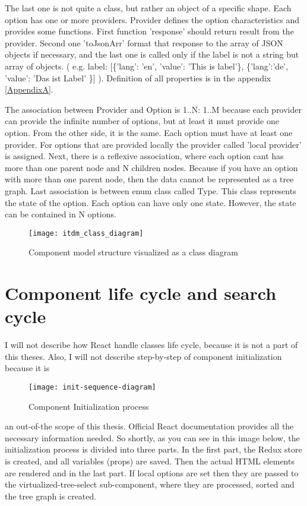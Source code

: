 The last one is not quite a class, but rather an object of a specific shape. Each option has one or more providers. Provider defines the option characteristics and provides some functions. First function 'response' should return result from the provider. Second one 'toJsonArr' format that response to the array of JSON objects if necessary, and the last one is called only if the label is not a string but array of objects. ( e.g. label: [\{'lang': 'en', 'value': 'This is label'\}, \{'lang':'de', 'value': 'Das ist Label' \}] ). Definition of all properties is in the appendix \ref{AppendixA}.

The association between Provider and Option is 1..N: 1..M because each provider can provide the infinite number of options, but at least it must provide one option. From the other side, it is the same. Each option must have at least one provider. For options that are provided locally the provider called 'local provider' is assigned. 
Next, there is a reflexive association, where each option cant has more than one parent node and N children nodes. Because if you have an option with more than one parent node, then the data cannot be represented as a tree graph.
Last association is between enum class called Type. This class represents the state of the option. Each option can have only one state. However, the state can be contained in N options.

\begin{figure}
    \centering
    \texttt{[image: itdm\_class\_diagram]}
    \decoRule
    \caption[Class Diagram]{Component model structure visualized as a class diagram}
    \label{fig:itdm_class_diagram}
 \end{figure}


\pagebreak

\section{Component life cycle and search cycle}

I will not describe how React handle classes life cycle, because it is not a part of this theses. Also, I will not describe step-by-step of component initialization because it is 
\begin{wrapfigure}{r}{.6\textwidth}
\texttt{[image: init-sequence-diagram]}
    \caption[Initialization]{Component Initialization process}
    \label{fig:init}
\end{wrapfigure}
an out-of-the scope of this thesis. Official React \parencite{react} documentation provides all the necessary information needed. So shortly, as you can see in this image below, the initialization process is divided into three parts. In the first part, the Redux store is created, and all variables (props) are saved. Then the actual HTML elements are rendered and in the last part. If local options are set then they are passed to the virtualized-tree-select sub-component, where they are processed, sorted and the tree graph is created.


